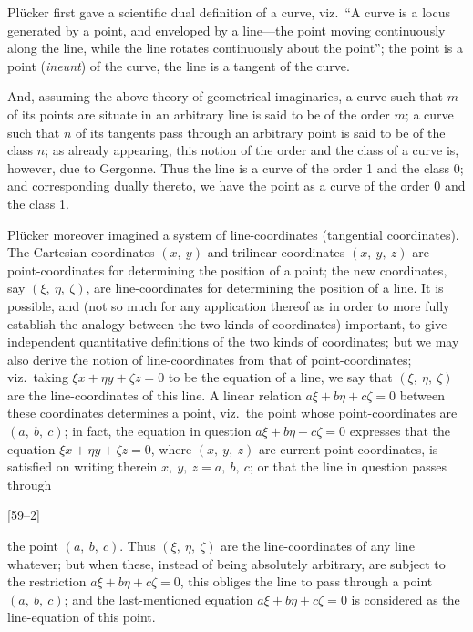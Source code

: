 \documentclass[12pt,a4paper,oneside]{book}
\newcommand{\paperref}[1]{\par\noindent\hfill[#1]\hfill\null\par}
\begin{document}
Pl\"ucker first gave a scientific dual definition of a curve, viz.\ ``A curve is a locus generated by a point, and enveloped by a line---the point moving continuously along the line, while the line rotates continuously about the point''; the point is a point (\textit{ineunt}) of the curve, the line is a tangent of the curve.

And, assuming the above theory of geometrical imaginaries, a curve such that $m$ of its points are situate in an arbitrary line is said to be of the order $m$; a curve such that $n$ of its tangents pass through an arbitrary point is said to be of the class $n$; as already appearing, this notion of the order and the class of a curve is, however, due to Gergonne. Thus the line is a curve of the order 1 and the class 0; and corresponding dually thereto, we have the point as a curve of the order 0 and the class 1.

Pl\"ucker moreover imagined a system of line-coordinates (tangential coordinates). The Cartesian coordinates $(x,\ y)$ and trilinear coordinates $(x,\ y,\ z)$ are point-coordinates for determining the position of a point; the new coordinates, say $(\xi,\ \eta,\ \zeta)$, are line-coordinates for determining the position of a line. It is possible, and (not so much for any application thereof as in order to more fully establish the analogy between the two kinds of coordinates) important, to give independent quantitative definitions of the two kinds of coordinates; but we may also derive the notion of line-coordinates from that of point-coordinates; viz.\ taking $\xi x+\eta y+\zeta z=0$ to be the equation of a line, we say that $(\xi,\ \eta,\ \zeta)$ are the line-coordinates of this line. A linear relation $a\xi+b\eta+c\zeta=0$ between these coordinates determines a point, viz.\ the point whose point-coordinates are $(a,\ b,\ c)$; in fact, the equation in question $a\xi+b\eta+c\zeta=0$ expresses that the equation $\xi x+\eta y+\zeta z=0$, where $(x,\ y,\ z)$ are current point-coordinates, is satisfied on writing therein $x,\ y,\ z=a,\ b,\ c$; or that the line in question passes through

\paperref{59--2}
\newpage
the point $(a,\ b,\ c)$. Thus $(\xi,\ \eta,\ \zeta)$ are the line-coordinates of any line whatever; but when these, instead of being absolutely arbitrary, are subject to the restriction $a\xi+b\eta+c\zeta=0$, this obliges the line to pass through a point $(a,\ b,\ c)$; and the last-mentioned equation $a\xi+b\eta+c\zeta=0$ is considered as the line-equation of this point.
\end{document}
